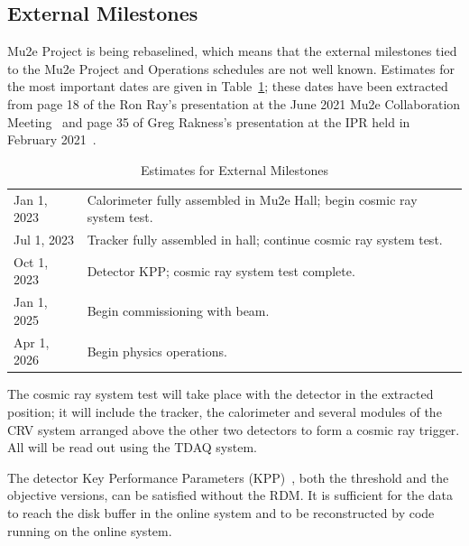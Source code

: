 \subsection{External Milestones}
\label{ssec:ExternalMilestones}

Mu2e Project is being rebaselined, which means that the external milestones tied to the Mu2e
Project and Operations schedules are not well known.
Estimates for the most important dates are given in Table~\ref{tab:externalmilestones};
these dates have been extracted from
page 18 of the Ron Ray's presentation at the June 2021 Mu2e Collaboration Meeting~\cite{ProjectUpdate202106}
and page 35 of Greg Rakness's presentation at the IPR held in February 2021~\cite{OperationsIPR}.

\begin{table}
\begin{center}
\caption[Estimates for External Milestones]{Estimates for External Milestones}
\label{tab:externalmilestones}
\begin{tabular}{ll}\hline
  Jan 1, 2023 & Calorimeter fully assembled in Mu2e Hall; begin cosmic ray system test. \\
  Jul 1, 2023 & Tracker fully assembled in hall; continue cosmic ray system test. \\
  Oct 1, 2023 & Detector KPP; cosmic ray system test complete. \\
  Jan 1, 2025 & Begin commissioning with beam. \\
  Apr 1, 2026 & Begin physics operations. \\
   \hline
  \end{tabular}
\end{center}
\end{table}



The cosmic ray system test will take place with the detector in the extracted position;
it will include the tracker, the calorimeter and several modules of the CRV system
arranged above the other two detectors to form a cosmic ray trigger.
All will be read out using the TDAQ system.

The detector Key Performance Parameters (KPP)~\cite{Mu2eKPPs},
both the threshold and the objective versions,
can be satisfied without the RDM.
It is sufficient for the data to reach the disk buffer in the online system
and to be reconstructed by code running on the online system.

